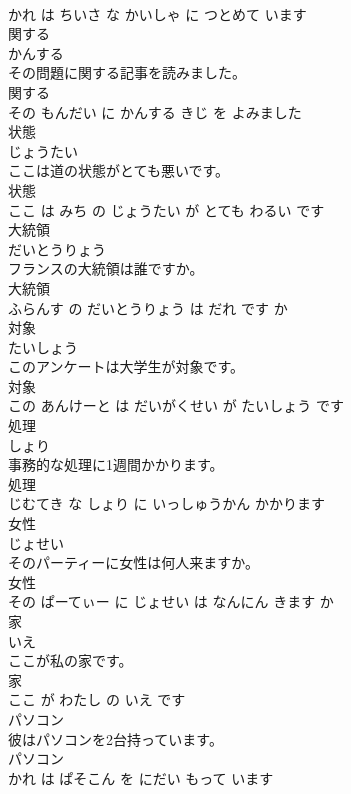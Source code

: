 \documentclass[8pt]{extreport}
\begin{document}
\begin{CJK}{UTF8}{min}
\\	かれ は ちいさ な かいしゃ に つとめて います			
\\	関する	
\\	かんする			
\\	その問題に関する記事を読みました。	
\\	関する 
\\	その もんだい に かんする きじ を よみました			
\\	状態	
\\	じょうたい			
\\	ここは道の状態がとても悪いです。	
\\	状態 
\\	ここ は みち の じょうたい が とても わるい です			
\\	大統領	
\\	だいとうりょう			
\\	フランスの大統領は誰ですか。	
\\	大統領 
\\	ふらんす の だいとうりょう は だれ です か			
\\	対象	
\\	たいしょう			
\\	このアンケートは大学生が対象です。	
\\	対象 
\\	この あんけーと は だいがくせい が たいしょう です			
\\	処理	
\\	しょり			
\\	事務的な処理に1週間かかります。	
\\	処理 
\\	じむてき な しょり に いっしゅうかん かかります			
\\	女性	
\\	じょせい			
\\	そのパーティーに女性は何人来ますか。	
\\	女性 
\\	その ぱーてぃー に じょせい は なんにん きます か			
\\	家	
\\	いえ			
\\	ここが私の家です。	
\\	家 
\\	ここ が わたし の いえ です			
\\	パソコン	
\\	彼はパソコンを2台持っています。	
\\	パソコン 
\\	かれ は ぱそこん を にだい もって います			

\end{CJK}
\end{document}
